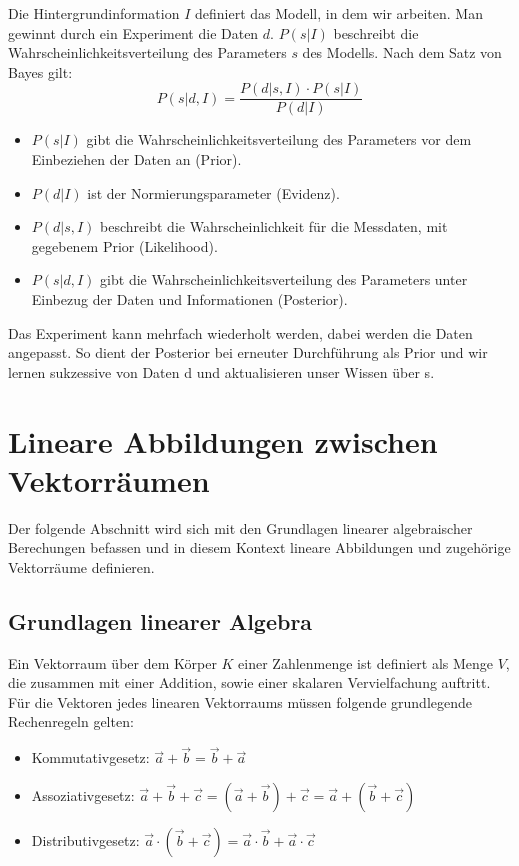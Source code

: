 \documentclass[]{dsadokumentation}
\begin{document}
Die Hintergrundinformation $I$ definiert das Modell, in dem wir arbeiten. Man gewinnt durch ein Experiment die Daten $d$. $P(s|I)$ beschreibt die Wahrscheinlichkeitsverteilung des Parameters $s$ des Modells. Nach dem Satz von Bayes gilt:
\begin{equation}
  P(s|d,I) = \frac{P(d|s,I)\cdot P(s|I)}{P(d|I)}
\end{equation}

\begin{itemize}
  \item $P(s|I)$ gibt die Wahrscheinlichkeitsverteilung des Parameters vor dem Einbeziehen der Daten an (Prior).
  \item $P(d|I)$ ist der Normierungsparameter (Evidenz).
  \item $P(d|s,I)$ beschreibt die Wahrscheinlichkeit für die Messdaten, mit gegebenem Prior (Likelihood).
  \item $P(s|d,I)$ gibt die Wahrscheinlichkeitsverteilung des Parameters unter Einbezug der Daten und Informationen (Posterior).
\end{itemize}

Das Experiment kann mehrfach wiederholt werden, dabei werden die Daten angepasst. So dient der Posterior bei erneuter Durchführung als Prior und wir lernen sukzessive von Daten d und aktualisieren unser Wissen über s.

\section{Lineare Abbildungen zwischen Vektorräumen}
Der folgende Abschnitt wird sich mit den Grundlagen linearer algebraischer Berechungen befassen und in diesem Kontext lineare Abbildungen und zugehörige Vektorräume definieren.

\subsection{Grundlagen linearer Algebra}
Ein Vektorraum über dem Körper $K$ einer Zahlenmenge ist definiert als Menge $V$, die zusammen mit einer Addition, sowie einer skalaren Vervielfachung auftritt. Für die Vektoren jedes linearen Vektorraums müssen folgende grundlegende Rechenregeln gelten:
\begin{itemize}
  \item Kommutativgesetz: $\vec{a} + \vec{b} = \vec{b} + \vec{a}$
  \item Assoziativgesetz: $\vec{a} + \vec{b} + \vec{c} = (\vec{a} +\vec{b}) + \vec{c} = \vec{a} + (\vec{b} +\vec{c})$
  \item Distributivgesetz: $\vec{a} \cdot (\vec{b} + \vec{c}) = \vec{a} \cdot \vec{b} + \vec{a} \cdot \vec{c}$
\end{itemize}
\end{document}
